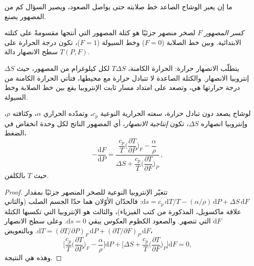 ما إن يعبر الوشاح الصاعد خط صلابته حتى يواصل الصعود، ويصير السؤال
كم من المصهور يصنع.

\begin{definition}\label{def:b2:mantle-melting:fraction}
\emph{كسر المصهور} $F$ لصخر منصهر جزئيًا هو
كتلة المصهور التي أنتجها مقسومةً على كتلته الابتدائية. وبين خط الصلابة
($F = 0$) وخط السيولة ($F = 1$)، تكون درجة الحرارة على سطح الانصهار
دالة $T(P, F)$.
\end{definition}

يتطلّب الانصهار حرارة: الحرارة الكامنة، $T\Delta S$ لكل كيلوغرام من المصهور، حيث
$\Delta S$ إنتروبيا الانصهار. والكتلة الصاعدة لا تتبادل حرارة مع
محيطها، فتأتي الحرارة الكامنة من درجة حرارتها هي، وتصعد
على امتداد مسار ثابت الإنتروبيا يقع بين خط الصلابة وخط السيولة.

\begin{proposition}\label{prop:b2:mantle-melting:productivity}
لوشاح يصعد دون تبادل حرارة، سعته الحرارية النوعية $c_p$، وتمدّده
الحراري $\alpha$، وكثافته $\rho$، وإنتروبيا انصهاره $\Delta S$، تكون
\emph{إنتاجية الانصهار}، أي المصهور الناتج لكل وحدة انخفاض في
الضغط،
\[
  -\frac{\mathrm dF}{\mathrm dP} =
  \frac{\dfrac{c_p}{T}\Big(\dfrac{\partial T}{\partial P}\Big)_F - \dfrac{\alpha}{\rho}}
       {\Delta S + \dfrac{c_p}{T}\Big(\dfrac{\partial T}{\partial F}\Big)_P}\,,
\]
حيث $T$ بالكلفن.
\end{proposition}

\begin{proof}
تتغيّر الإنتروبيا النوعية للصخر المنصهر جزئيًا بمقدار $\mathrm ds = c_p\,
\mathrm dT/T - (\alpha/\rho)\,\mathrm dP + \Delta S\,\mathrm dF$: فالحدّان
الأوّلان هما حدّا الجسم الصلب (والثاني علاقة ماكسويل، المذكورة من
كتب الفيزياء)، والثالث هو الإنتروبيا التي تكسبها الكتلة $\mathrm dF$ التي
تنصهر. والصعود الكظوم العكوس يبقي $\mathrm ds = 0$. وعلى سطح
الانصهار $\mathrm dT = (\partial T/\partial P)_F\,\mathrm dP + (\partial
T/\partial F)_P\,\mathrm dF$. وبالتعويض،
\[
  \Big[\frac{c_p}{T}\Big(\frac{\partial T}{\partial P}\Big)_F - \frac{\alpha}{\rho}\Big]\mathrm dP
  + \Big[\Delta S + \frac{c_p}{T}\Big(\frac{\partial T}{\partial F}\Big)_P\Big]\mathrm dF = 0,
\]
وهذه هي النتيجة.
\end{proof}

